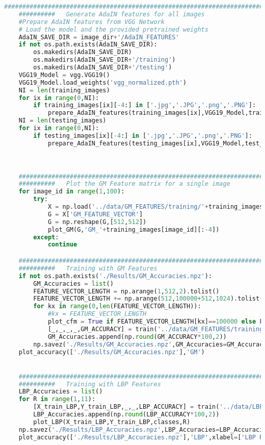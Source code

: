 \documentclass{article}
\begin{document}
\begin{lstlisting}[language=Python]
	###############################################################################################################
	##########	 Generate AdaIN features for all images
	#Prepare AdaIN features from VGG Network
	# Load the model and the provided pretrained weights
	AdaIN_SAVE_DIR = image_dir+'/AdaIN_FEATURES'
	if not os.path.exists(AdaIN_SAVE_DIR):
		os.makedirs(AdaIN_SAVE_DIR)
		os.makedirs(AdaIN_SAVE_DIR+'/training')
		os.makedirs(AdaIN_SAVE_DIR+'/testing')
	VGG19_Model = vgg.VGG19()
	VGG19_Model.load_weights('vgg_normalized.pth')
	NI = len(training_images)
	for ix in range(0,NI):
		if training_images[ix][-4:] in ['.jpg','.JPG','.png','.PNG']:
			prepare_AdaIN_features(training_images[ix],VGG19_Model,train_dir,AdaIN_SAVE_DIR,'training',ix,NI)
	NI = len(testing_images)
	for ix in range(0,NI):
		if testing_images[ix][-4:] in ['.jpg','.JPG','.png','.PNG']:
			prepare_AdaIN_features(testing_images[ix],VGG19_Model,test_dir,AdaIN_SAVE_DIR,'testing',ix,NI)



	###############################################################################################################
	##########	 Plot the GM Feature matrix for a single image
	for image_id in range(1,100):
		try:
			X = np.load('../data/GM_FEATURES/training/'+training_images[image_id][:-4]+'.npz',allow_pickle=True)
			G = X['GM_FEATURE_VECTOR']
			G = np.reshape(G,[512,512])
			plot_GM(G,'GM_'+training_images[image_id][:-4])
		except:
			continue

	###############################################################################################################
	##########	 Training with GM Features
	if not os.path.exists('./Results/GM_Accuracies.npz'):
		GM_Accuracies = list()
		FEATURE_VECTOR_LENGTH = np.arange(1,512,2).tolist()
		FEATURE_VECTOR_LENGTH += np.arange(512,100000+512,1024).tolist()
		for kx in range(0,len(FEATURE_VECTOR_LENGTH)):
			#kx = FEATURE_VECTOR_LENGTH
			plot_cfm = True if FEATURE_VECTOR_LENGTH[kx]==100000 else False
			[_,_,_,_,GM_ACCURACY] = train('../data/GM_FEATURES/training','../data/GM_FEATURES/testing','GM',classes,FEATURE_VECTOR_LENGTH[kx],verbose=1,plot_cfm=plot_cfm)
			GM_Accuracies.append(np.round(GM_ACCURACY*100,2))
		np.savez('./Results/GM_Accuracies.npz',GM_Accuracies=GM_Accuracies,FEATURE_VECTOR_LENGTH=FEATURE_VECTOR_LENGTH)
	plot_accuracy(['./Results/GM_Accuracies.npz'],'GM')


	###############################################################################################################
	##########	 Training with LBP Features
	LBP_Accuracies = list()
	for R in range(1,11):
		[X_train_LBP,Y_train_LBP,_,_,LBP_ACCURACY] = train('../data/LBP_HISTOGRAMS/R_'+str(R)+'/training','../data/LBP_HISTOGRAMS/R_'+str(R)+'/testing','LBP',classes,-1,verbose=1,plot_cfm=True,params=['_R_'+str(R)])
		LBP_Accuracies.append(np.round(LBP_ACCURACY*100,2))
		plot_LBP(X_train_LBP,Y_train_LBP,classes,R)
	np.savez('./Results/LBP_Accuracies.npz',LBP_Accuracies=LBP_Accuracies,FEATURE_VECTOR_LENGTH=[s for s in range(1,11)])
	plot_accuracy(['./Results/LBP_Accuracies.npz'],'LBP',xlabel=['LBP Radius of circular patter, R (#pixels)'])



\end{lstlisting}
\end{document}
